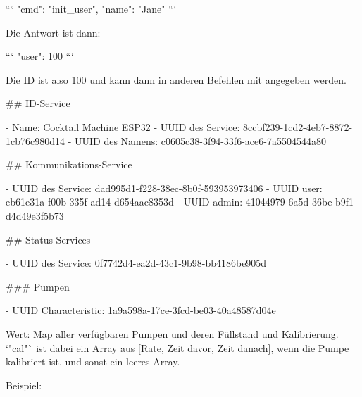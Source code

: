 ```
{"cmd": "init_user", "name": "Jane"}
```

Die Antwort ist dann:

```
{"user": 100}
```

Die ID ist also 100 und kann dann in anderen Befehlen mit angegeben werden.

## ID-Service

- Name: Cocktail Machine ESP32
- UUID des Service: 8ccbf239-1cd2-4eb7-8872-1cb76c980d14
- UUID des Namens: c0605c38-3f94-33f6-ace6-7a5504544a80

## Kommunikations-Service

- UUID des Service: dad995d1-f228-38ec-8b0f-593953973406
- UUID user: eb61e31a-f00b-335f-ad14-d654aac8353d
- UUID admin: 41044979-6a5d-36be-b9f1-d4d49e3f5b73

## Status-Services

- UUID des Service: 0f7742d4-ea2d-43c1-9b98-bb4186be905d

### Pumpen

- UUID Characteristic: 1a9a598a-17ce-3fcd-be03-40a48587d04e

Wert: Map aller verfügbaren Pumpen und deren Füllstand und Kalibrierung. `"cal"` ist dabei ein Array aus [Rate, Zeit davor, Zeit danach], wenn die Pumpe kalibriert ist, und sonst ein leeres Array.

Beispiel:

